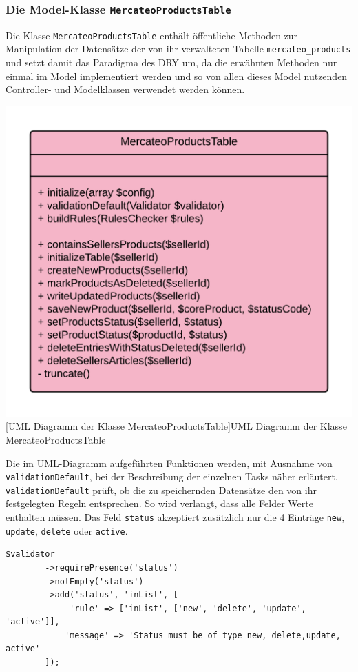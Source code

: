 	\subsubsection{Die Model-Klasse \texttt{MercateoProductsTable}}
	
	Die Klasse \texttt{MercateoProductsTable} enthält öffentliche Methoden zur Manipulation der Datensätze der von ihr verwalteten Tabelle \texttt{mercateo\_products} und setzt damit das Paradigma des DRY um, da die erwähnten Methoden nur einmal im Model implementiert werden und so von allen dieses Model nutzenden Controller- und Modelklassen verwendet werden können. \\
	\begin{minipage}{\linewidth}
		\vspace{1em}
		\centering
		\includegraphics[width=0.6 \linewidth]{img/MercateoProductsTableUML}
		[UML Diagramm der Klasse MercateoProductsTable]{UML Diagramm der Klasse MercateoProductsTable}
		\vspace{1em}
	\end{minipage}
	Die im UML-Diagramm aufgeführten Funktionen werden, mit Ausnahme von \texttt{validationDefault}, bei der Beschreibung der einzelnen Tasks näher erläutert. \texttt{validationDefault} prüft, ob die zu speichernden Datensätze den von ihr festgelegten Regeln entsprechen. So wird verlangt, dass alle Felder Werte enthalten müssen. Das Feld \texttt{status} akzeptiert zusätzlich nur die 4 Einträge \texttt{new}, \texttt{update}, \texttt{delete} oder \texttt{active}.
	
	\begin{lstlisting}[caption={Auszug aus der Validator Methode der Klasse MercateoProductsTable}] 
	$validator
     	->requirePresence('status')
     	->notEmpty('status')
     	->add('status', 'inList', [
        	 'rule' => ['inList', ['new', 'delete', 'update', 'active']],
         	'message' => 'Status must be of type new, delete,update, active'
     	]);
	\end{lstlisting}
	

